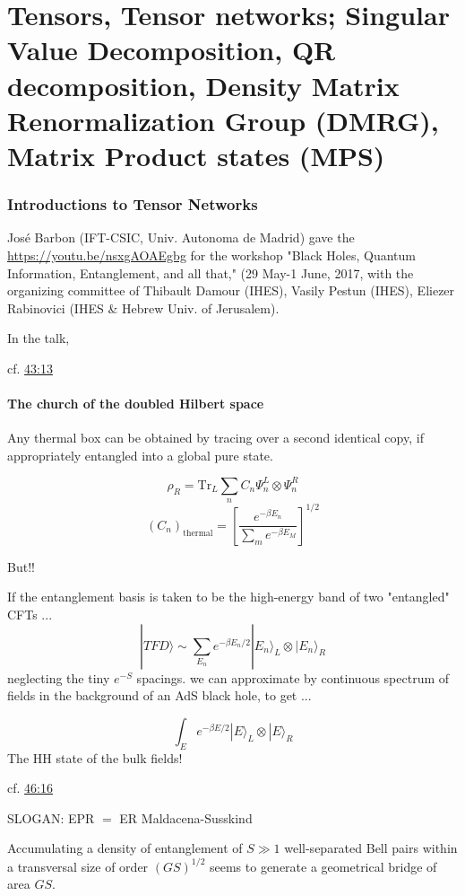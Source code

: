 \part{Tensors, Tensor networks; Singular Value Decomposition, QR decomposition, Density Matrix Renormalization Group (DMRG), Matrix Product states (MPS)}


\section{Introductions to Tensor Networks}

Jos\'{e} Barbon (IFT-CSIC, Univ. Autonoma de Madrid) gave the \href{Workshop introductory overview}{https://youtu.be/nsxgAOAEgbg} for the workshop "Black Holes, Quantum Information, Entanglement, and all that," (29 May-1 June, 2017, with the organizing committee of Thibault Damour (IHES), Vasily Pestun (IHES), Eliezer Rabinovici (IHES \& Hebrew Univ. of Jerusalem).  

In the talk, 


cf. \href{https://youtu.be/nsxgAOAEgbg?t=43m13s}{43:13}  

\subsection*{The church of the doubled Hilbert space}
 
Any thermal box can be obtained by tracing over a second identical copy, if appropriately entangled into a global pure state.  

\[
\rho_R = \text{Tr}_L \sum_n C_n \Psi_n^L \otimes \Psi_n^R
\]
\[
(C_n)_{\text{thermal}} = \left[ \frac{ e^{-\beta E_n} }{ \sum_m e^{-\beta E_M} } \right]^{1/2}
\]

But!!

If the entanglement basis is taken to be the high-energy band of two "entangled" CFTs ... 
\[
|TFD \rangle \sim \sum_{E_n} e^{-\beta E_n/2} | E_n \rangle_L \otimes | E_n \rangle_R
\]
neglecting the tiny $e^{-S}$ spacings. we can approximate by continuous spectrum of fields in the background of an AdS black hole, to get ... 
 
\[
\int_E e^{-\beta E/2} |E\rangle_L \otimes | E\rangle_R 
\]
The HH state of the bulk fields!  

cf. \href{https://youtu.be/nsxgAOAEgbg?t=46m16s}{46:16}

SLOGAN: EPR $=$ ER
Maldacena-Susskind  

Accumulating a density of entanglement of $S \gg 1$ well-separated Bell pairs within a transversal size of order $(GS)^{1/2}$  seems to generate a geometrical bridge of area $GS$.  



